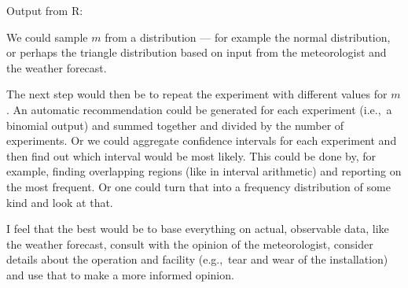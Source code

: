 \documentclass[a4paper,english,12pt]{article}
\begin{document}
Output from R:

We could sample $m$ from a distribution --- for example the normal
distribution, or perhaps the triangle distribution based on input from the
meteorologist and the weather forecast.

The next step would then be to repeat the experiment with different values for
$m$. An automatic recommendation could be generated for each experiment
(i.e.,~a binomial output) and summed together and divided by the number of
experiments. Or we could aggregate confidence intervals for each experiment and
then find out which interval would be most likely. This could be done by, for
example, finding overlapping regions (like in interval arithmetic) and
reporting on the most frequent. Or one could turn that into a frequency
distribution of some kind and look at that.

I feel that the best would be to base everything on actual, observable data,
like the weather forecast, consult with the opinion of the meteorologist,
consider details about the operation and facility (e.g.,~tear and wear of the
installation) and use that to make a more informed opinion.

\clearpage


\end{document}
